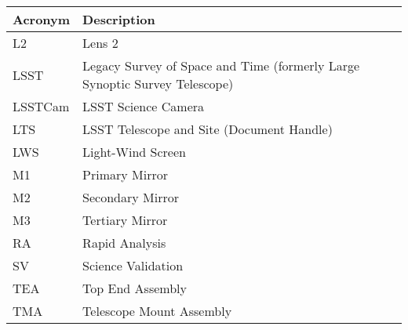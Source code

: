 \addtocounter{table}{-1}
\begin{longtable}{p{}p{}}\hline
\textbf{Acronym} & \textbf{Description}  \\\hline

L2 & Lens 2 \\\hline
LSST & Legacy Survey of Space and Time (formerly Large Synoptic Survey Telescope) \\\hline
LSSTCam & LSST Science Camera \\\hline
LTS & LSST Telescope and Site (Document Handle) \\\hline
LWS & Light-Wind Screen \\\hline
M1 & Primary Mirror \\\hline
M2 & Secondary Mirror \\\hline
M3 & Tertiary Mirror \\\hline
RA & Rapid Analysis \\\hline
SV & Science Validation \\\hline
TEA & Top End Assembly \\\hline
TMA & Telescope Mount Assembly \\\hline
\end{longtable}
